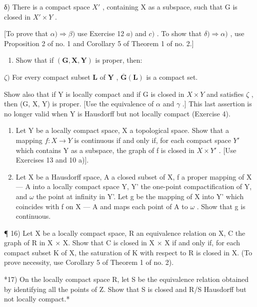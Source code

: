 δ) There is a compact space \(X'\) , containing X as a subspace, such that G is closed in \(X' \times Y\) .

{[}To prove that \(\alpha) \Longrightarrow \beta)\) use Exercise 12 \(a)\) and \(c)\) . To show that \(\delta) \Longrightarrow \alpha)\) , use Proposition 2 of no. 1 and Corollary 5 of Theorem 1 of no. 2.{]}

\begin{enumerate}
\def\labelenumi{\alph{enumi})}
\setcounter{enumi}{1}
\tightlist
\item
  Show that if \((\mathbf{G},\mathbf{X},\mathbf{Y})\) is proper, then:
\end{enumerate}

\(\zeta)\) For every compact subset \(\mathbf{L}\) of \(\mathbf{Y}\) , \(\overline{\mathbf{G}}(\mathbf{L})\) is a compact set.

Show also that if Y is locally compact and if G is closed in \(X \times Y\) and satisfies \(\zeta\) , then (G, X, Y) is proper. {[}Use the equivalence of \(\alpha\) and \(\gamma\) .{]} This last assertion is no longer valid when Y is Hausdorff but not locally compact (Exercise 4).

\begin{enumerate}
\def\labelenumi{\arabic{enumi})}
\setcounter{enumi}{13}
\item
  Let Y be a locally compact space, X a topological space. Show that a mapping \(f: X \rightarrow Y\) is continuous if and only if, for each compact space \(Y'\) which contains Y as a subspace, the graph of f is closed in \(X \times Y'\) . {[}Use Exercises 13 and 10 a){]}.
\item
  Let X be a Hausdorff space, A a closed subset of X, f a proper mapping of X --- A into a locally compact space Y, Y' the one-point compactification of Y, and \(\omega\) the point at infinity in Y'. Let g be the mapping of X into Y' which coincides with f on X --- A and maps each point of A to \(\omega\) . Show that g is continuous.
\end{enumerate}

¶ 16) Let X be a locally compact space, R an equivalence relation on X, C the graph of R in X × X. Show that C is closed in X × X if and only if, for each compact subset K of X, the saturation of K with respect to R is closed in X. (To prove necessity, use Corollary 5 of Theorem 1 of no. 2).

*17) On the locally compact space R, let S be the equivalence relation obtained by identifying all the points of Z. Show that S is closed and R/S Hausdorff but not locally compact.*

